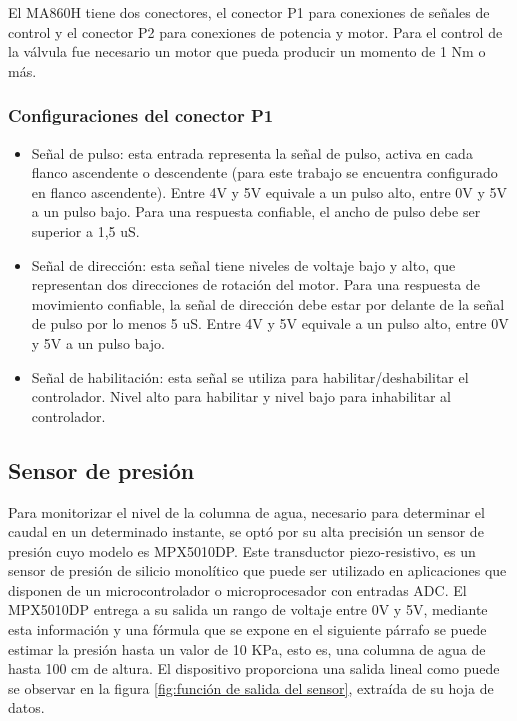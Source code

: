 El MA860H tiene dos conectores, el conector P1 para conexiones de señales de control y el conector P2 para conexiones de potencia y motor.     
Para el control de la válvula fue necesario un motor que pueda producir un momento de 1 Nm o más. 

\subsubsection{Configuraciones del conector P1}
\begin{itemize}

\item Señal de pulso: esta entrada representa la señal de pulso, activa en cada flanco ascendente o descendente (para este trabajo se encuentra configurado en flanco ascendente). Entre 4V y 5V equivale a un pulso alto, entre 0V y 5V a un pulso bajo. Para una respuesta confiable, el ancho de pulso debe ser superior a 1,5 uS. 

\item Señal de dirección: esta señal tiene niveles de voltaje bajo y alto, que representan dos direcciones de rotación del motor. Para una respuesta de movimiento confiable, la señal de dirección debe estar por delante de la señal de pulso por lo menos 5 uS. Entre 4V y 5V equivale a un pulso alto, entre 0V y 5V a un pulso bajo.

\item Señal de habilitación: esta señal se utiliza para habilitar/deshabilitar el controlador. Nivel alto para habilitar y nivel bajo para inhabilitar al controlador.

\end{itemize}
\subsection{Sensor de presión}
Para monitorizar el nivel de la columna de agua, necesario para determinar el caudal en un determinado instante, se optó por su alta precisión un sensor de presión cuyo modelo es MPX5010DP. Este transductor piezo-resistivo, es un sensor de presión de silicio monolítico que puede ser utilizado en aplicaciones que disponen de un microcontrolador o microprocesador con entradas ADC.
El MPX5010DP entrega a su salida un rango de voltaje entre 0V y 5V, mediante esta información y una fórmula que se expone en el siguiente párrafo se puede estimar la presión hasta un valor de 10 KPa, esto es, una columna de agua de hasta 100 cm de altura.
El dispositivo proporciona una salida lineal como puede se observar en la figura \ref{fig:función de salida del sensor}, extraída de su hoja de datos.

